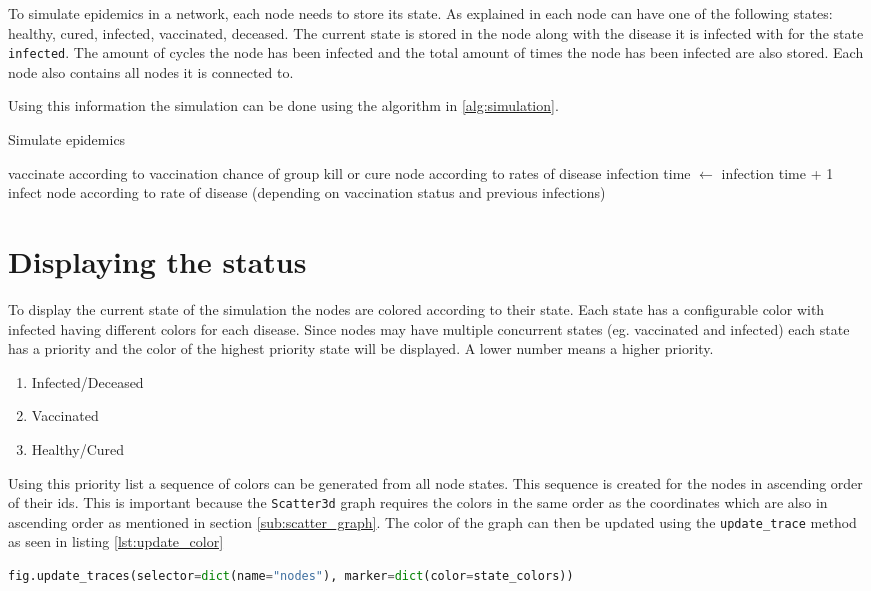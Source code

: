 To simulate epidemics in a network, each node needs to store its state. As explained in %
each node can have one of the following states: healthy, cured, infected, vaccinated, deceased. The current state is stored in the node along with the disease it is infected with for the state \texttt{infected}. The amount of cycles the node has been infected and the total amount of times the node has been infected are also stored. Each node also contains all nodes it is connected to.

Using this information the simulation can be done using the algorithm in \ref{alg:simulation}.

\begin{algorithm}
\caption{Simulate epidemics}
\label{alg:simulation}
\begin{algorithmic}
        \State vaccinate according to vaccination chance of group
    \EndIf
            \State kill or cure node according to rates of disease
        \Else
            \State infection time $\gets$ infection time + 1
                \State infect node according to rate of disease 
                \State (depending on vaccination status and previous infections)
            \EndFor
        \EndIf
    \EndIf
\EndFor
\end{algorithmic}
\end{algorithm}

\section{Displaying the status}
\label{sec:color_sequence}
To display the current state of the simulation the nodes are colored according to their state. Each state has a configurable color with infected having different colors for each disease. Since nodes may have multiple concurrent states (eg. vaccinated and infected) each state has a priority and the color of the highest priority state will be displayed. A lower number means a higher priority.
\begin{enumerate}
    \item Infected/Deceased
    \item Vaccinated
    \item Healthy/Cured
\end{enumerate}

Using this priority list a sequence of colors can be generated from all node states. This sequence is created for the nodes in ascending order of their ids. This is important because the \texttt{Scatter3d} graph requires the colors in the same order as the coordinates which are also in ascending order as mentioned in section \ref{sub:scatter_graph}. The color of the graph can then be updated using the \texttt{update\_trace} method as seen in listing \ref{lst:update_color}

\begin{lstlisting}[language=python, caption={Updating the colors of the graph}, label={lst:update_color}]
fig.update_traces(selector=dict(name="nodes"), marker=dict(color=state_colors))
\end{lstlisting}